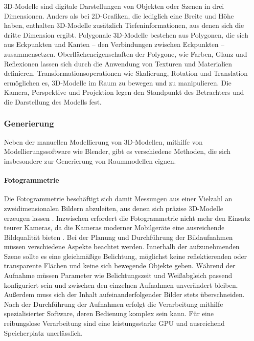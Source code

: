 3D-Modelle sind digitale Darstellungen von Objekten oder Szenen in drei Dimensionen. Anders als bei 2D-Grafiken, die lediglich eine Breite und Höhe haben, enthalten 3D-Modelle zusätzlich Tiefeninformationen, aus denen sich die dritte Dimension ergibt. Polygonale 3D-Modelle bestehen aus Polygonen, die sich aus Eckpunkten und Kanten – den Verbindungen zwischen Eckpunkten – zusammensetzen. Oberflächeneigenschaften der Polygone, wie Farben, Glanz und Reflexionen lassen sich durch die Anwendung von Texturen und Materialien definieren. Transformationsoperationen wie Skalierung, Rotation und Translation ermöglichen es, 3D-Modelle im Raum zu bewegen und zu manipulieren. Die Kamera, Perspektive und Projektion legen den Standpunkt des Betrachters und die Darstellung des Modells fest.\cite[S.~8-16]{Parisi2014}

\subsubsection{Generierung}
Neben der manuellen Modellierung von 3D-Modellen, mithilfe von Modellierungssoftware wie Blender, gibt es verschiedene Methoden, die sich insbesondere zur Generierung von Raummodellen eignen.

\paragraph{Fotogrammetrie}

Die Fotogrammetrie beschäftigt sich damit Messungen aus einer Vielzahl an zweidimensionalen Bildern abzuleiten, aus denen sich präzise 3D-Modelle erzeugen lassen \cite[S.~19]{Aber2010}. Inzwischen erfordert die Fotogrammetrie nicht mehr den Einsatz teurer Kameras, da die Kameras moderner Mobilgeräte eine ausreichende Bildqualität bieten \cite{Cohrs2021}. Bei der Planung und Durchführung der Bildaufnahmen müssen verschiedene Aspekte beachtet werden. Innerhalb der aufzunehmenden Szene sollte es eine gleichmäßige Belichtung, möglichst keine reflektierenden oder transparente Flächen und keine sich bewegende Objekte geben. Während der Aufnahme müssen Parameter wie Belichtungszeit und Weißabgleich passend konfiguriert sein und zwischen den einzelnen Aufnahmen unverändert bleiben. Außerdem muss sich der Inhalt aufeinanderfolgender Bilder stets überschneiden.\cite{Cohrs2021b} Nach der Durchführung der Aufnahmen erfolgt die Verarbeitung mithilfe spezialisierter Software, deren Bedienung komplex sein kann. Für eine reibungslose Verarbeitung sind eine leistungsstarke \ac{GPU} und ausreichend Speicherplatz unerlässlich.\cite{Cohrs2021c}

